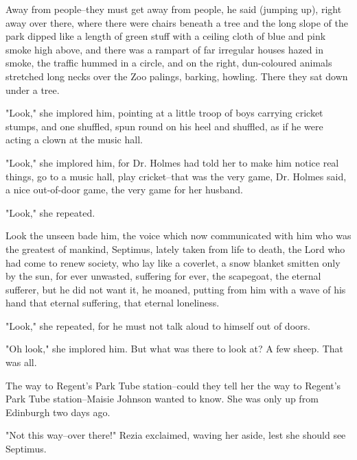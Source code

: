 \documentclass[lang=cn,10pt]{elegantbook}
\begin{document}
Away from people--they must get away from people, he said (jumping
up), right away over there, where there were chairs beneath a tree
and the long slope of the park dipped like a length of green stuff
with a ceiling cloth of blue and pink smoke high above, and there
was a rampart of far irregular houses hazed in smoke, the traffic
hummed in a circle, and on the right, dun-coloured animals
stretched long necks over the Zoo palings, barking, howling.  There
they sat down under a tree.

"Look," she implored him, pointing at a little troop of boys
carrying cricket stumps, and one shuffled, spun round on his heel
and shuffled, as if he were acting a clown at the music hall.

"Look," she implored him, for Dr. Holmes had told her to make him
notice real things, go to a music hall, play cricket--that was the
very game, Dr. Holmes said, a nice out-of-door game, the very game
for her husband.

"Look," she repeated.

Look the unseen bade him, the voice which now communicated with him
who was the greatest of mankind, Septimus, lately taken from life
to death, the Lord who had come to renew society, who lay like a
coverlet, a snow blanket smitten only by the sun, for ever
unwasted, suffering for ever, the scapegoat, the eternal sufferer,
but he did not want it, he moaned, putting from him with a wave of
his hand that eternal suffering, that eternal loneliness.

"Look," she repeated, for he must not talk aloud to himself out of
doors.

"Oh look," she implored him.  But what was there to look at?  A few
sheep.  That was all.

The way to Regent's Park Tube station--could they tell her the way
to Regent's Park Tube station--Maisie Johnson wanted to know.  She
was only up from Edinburgh two days ago.

"Not this way--over there!" Rezia exclaimed, waving her aside, lest
she should see Septimus.
\end{document}
